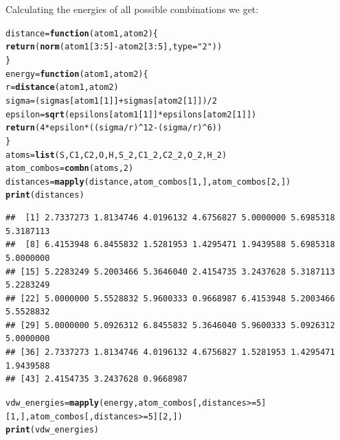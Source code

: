 \documentclass{article}\usepackage[]{graphicx}\usepackage[]{color}
\makeatletter
\newcommand{\hlnum}[1]{\textcolor[rgb]{0.686,0.059,0.569}{#1}}%
\newcommand{\hlstr}[1]{\textcolor[rgb]{0.192,0.494,0.8}{#1}}%
\newcommand{\hlopt}[1]{\textcolor[rgb]{0,0,0}{#1}}%
\newcommand{\hlstd}[1]{\textcolor[rgb]{0.345,0.345,0.345}{#1}}%
\newcommand{\hlkwa}[1]{\textcolor[rgb]{0.161,0.373,0.58}{\textbf{#1}}}%
\newcommand{\hlkwb}[1]{\textcolor[rgb]{0.69,0.353,0.396}{#1}}%
\newcommand{\hlkwc}[1]{\textcolor[rgb]{0.333,0.667,0.333}{#1}}%
\newcommand{\hlkwd}[1]{\textcolor[rgb]{0.737,0.353,0.396}{\textbf{#1}}}%
\newenvironment{kframe}{%
 \def\at@end@of@kframe{}%
 \ifinner\ifhmode%
  \def\at@end@of@kframe{\end{minipage}}%
  \begin{minipage}{\columnwidth}%
 \fi\fi%
 \def\FrameCommand##1{\hskip\@totalleftmargin \hskip-\fboxsep
 \colorbox{shadecolor}{##1}\hskip-\fboxsep
     \hskip-\linewidth \hskip-\@totalleftmargin \hskip\columnwidth}%
 \MakeFramed {\advance\hsize-\width
   \@totalleftmargin\z@ \linewidth\hsize
   \@setminipage}}%
 {\par\unskip\endMakeFramed%
 \at@end@of@kframe}
\newenvironment{knitrout}{}{} %
\makeatother
\begin{document}
Calculating the energies of all possible combinations we get:

\begin{knitrout}
\color{fgcolor}\begin{kframe}
\begin{alltt}
  \hlstd{distance}\hlkwb{=}\hlkwa{function}\hlstd{(}\hlkwc{atom1}\hlstd{,}\hlkwc{atom2}\hlstd{)\{}
    \hlkwd{return}\hlstd{(}\hlkwd{norm}\hlstd{(atom1[}\hlnum{3}\hlopt{:}\hlnum{5}\hlstd{]}\hlopt{-}\hlstd{atom2[}\hlnum{3}\hlopt{:}\hlnum{5}\hlstd{],}\hlkwc{type}\hlstd{=}\hlstr{"2"}\hlstd{))}
  \hlstd{\}}
  \hlstd{energy}\hlkwb{=}\hlkwa{function}\hlstd{(}\hlkwc{atom1}\hlstd{,}\hlkwc{atom2}\hlstd{)\{}
    \hlstd{r}\hlkwb{=}\hlkwd{distance}\hlstd{(atom1,atom2)}
    \hlstd{sigma} \hlkwb{=} \hlstd{(sigmas[atom1[}\hlnum{1}\hlstd{]]}\hlopt{+}\hlstd{sigmas[atom2[}\hlnum{1}\hlstd{]])}\hlopt{/}\hlnum{2}
    \hlstd{epsilon} \hlkwb{=} \hlkwd{sqrt}\hlstd{(epsilons[atom1[}\hlnum{1}\hlstd{]]}\hlopt{*}\hlstd{epsilons[atom2[}\hlnum{1}\hlstd{]])}
    \hlkwd{return}\hlstd{(}\hlnum{4}\hlopt{*}\hlstd{epsilon}\hlopt{*}\hlstd{((sigma}\hlopt{/}\hlstd{r)}\hlopt{^}\hlnum{12}\hlopt{-}\hlstd{(sigma}\hlopt{/}\hlstd{r)}\hlopt{^}\hlnum{6}\hlstd{))}
  \hlstd{\}}
  \hlstd{atoms} \hlkwb{=} \hlkwd{list}\hlstd{(S,C1,C2,O,H,S_2,C1_2,C2_2,O_2,H_2)}
  \hlstd{atom_combos} \hlkwb{=} \hlkwd{combn}\hlstd{(atoms,}\hlnum{2}\hlstd{)}
  \hlstd{distances}\hlkwb{=}\hlkwd{mapply}\hlstd{(distance,atom_combos[}\hlnum{1}\hlstd{,],atom_combos[}\hlnum{2}\hlstd{,])}
  \hlkwd{print}\hlstd{(distances)}
\end{alltt}
\begin{verbatim}
##  [1] 2.7337273 1.8134746 4.0196132 4.6756827 5.0000000 5.6985318 5.3187113
##  [8] 6.4153948 6.8455832 1.5281953 1.4295471 1.9439588 5.6985318 5.0000000
## [15] 5.2283249 5.2003466 5.3646040 2.4154735 3.2437628 5.3187113 5.2283249
## [22] 5.0000000 5.5528832 5.9600333 0.9668987 6.4153948 5.2003466 5.5528832
## [29] 5.0000000 5.0926312 6.8455832 5.3646040 5.9600333 5.0926312 5.0000000
## [36] 2.7337273 1.8134746 4.0196132 4.6756827 1.5281953 1.4295471 1.9439588
## [43] 2.4154735 3.2437628 0.9668987
\end{verbatim}
\begin{alltt}
  \hlstd{vdw_energies} \hlkwb{=} \hlkwd{mapply}\hlstd{(energy,atom_combos[,distances}\hlopt{>=}\hlnum{5}\hlstd{][}\hlnum{1}\hlstd{,],atom_combos[,distances}\hlopt{>=}\hlnum{5}\hlstd{][}\hlnum{2}\hlstd{,])}
  \hlkwd{print}\hlstd{(vdw_energies)}
\end{alltt}

\end{kframe}
\end{knitrout}
\end{document}
